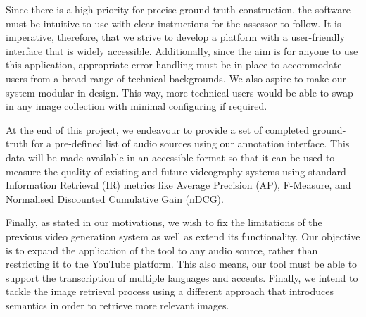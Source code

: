\documentclass{l4proj}
\begin{document}
Since there is a high priority for precise ground-truth construction, the software must be intuitive to use with clear instructions for the assessor to follow. It is imperative, therefore, that we strive to develop a platform with a user-friendly interface that is widely accessible. Additionally, since the aim is for anyone to use this application, appropriate error handling must be in place to accommodate users from a broad range of technical backgrounds. We also aspire to make our system modular in design. This way, more technical users would be able to swap in any image collection with minimal configuring if required.

At the end of this project, we endeavour to provide a set of completed ground-truth for a pre-defined list of audio sources using our annotation interface. This data will be made available in an accessible format so that it can be used to measure the quality of existing and future videography systems using standard Information Retrieval (IR) metrics like Average Precision (AP), F-Measure, and Normalised Discounted Cumulative Gain (nDCG).

Finally, as stated in our motivations, we wish to fix the limitations of the previous video generation system as well as extend its functionality. Our objective is to expand the application of the tool to any audio source, rather than restricting it to the YouTube platform. This also means, our tool must be able to support the transcription of multiple languages and accents. Finally, we intend to tackle the image retrieval process using a different approach that introduces semantics in order to retrieve more relevant images.




\end{document}
